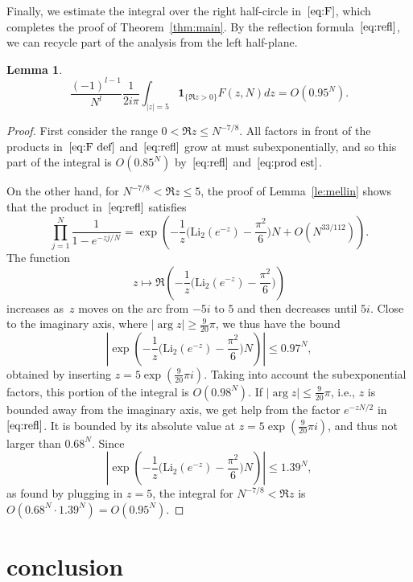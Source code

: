 \documentclass[a4paper]{amsart}
\newtheorem{lemma}[theorem]{Lemma}
\begin{document}
Finally, we estimate the integral over the right half-circle in~$\ref{eq:F}$,
which completes the proof of Theorem~\ref{thm:main}.
By the reflection formula~$\ref{eq:refl}$, we can recycle part of the
analysis from the left half-plane.

\begin{lemma}
  \[
   \frac{(-1)^{l-1}}{N^l} \frac{1}{2i\pi} \int_{|z|=5}
     \mathbf{1}_{\{\Re z>0\}} F(z,N) dz = O(0.95^N).
  \]
\end{lemma}
\begin{proof}
  First consider the range $0< \Re z \leq N^{-7/8}$. All factors
  in front of the products in~$\ref{eq:F def}$ and~$\ref{eq:refl}$
  grow at must subexponentially, and so this part of the integral
  is $O(0.85^N)$ by~$\ref{eq:refl}$ and~$\ref{eq:prod est}$.
  
  On the other hand, for $N^{-7/8}< \Re z \leq 5$, the proof
  of Lemma~\ref{le:mellin} shows that the product in~$\ref{eq:refl}$
  satisfies
  \[
    \prod_{j=1}^N \frac{1}{1-e^{-zj/N}} = \exp\left(
    -\frac{1}{z}\Big( \mathrm{Li}_2(e^{-z}) - \frac{\pi^2}{6}\Big)N
    +O(N^{33/112}) \right).
  \]
  The function
  \[
    z \mapsto \Re\left(-\frac{1}{z}
      \Big( \mathrm{Li}_2(e^{-z}) - \frac{\pi^2}{6}\Big) \right)
  \]
  increases as~$z$ moves on the arc from $-5i$ to $5$ and then
  decreases until $5i$. Close to the imaginary axis, where
  $|\arg z|\geq \tfrac{9}{20}\pi$, we thus
  have the bound
  \[
    \left|\exp\left(
    -\frac{1}{z}\Big( \mathrm{Li}_2(e^{-z}) - \frac{\pi^2}{6}\Big)N \right) \right|
    \leq 0.97^N,
  \]
  obtained by inserting $z=5\exp(\tfrac{9}{20}\pi i)$. Taking into account
  the subexponential factors, this portion of the integral
  is $O(0.98^N)$. If $|\arg z|\leq \tfrac{9}{20}\pi$, i.e., $z$ is bounded away
  from the imaginary axis, we get help from the factor $e^{-zN/2}$
  in~$\ref{eq:refl}$. It is bounded by its absolute value
  at $z=5\exp(\tfrac{9}{20}\pi i)$, and thus not larger than $0.68^N$.
  Since
  \[
    \left|\exp\left(
    -\frac{1}{z}\Big( \mathrm{Li}_2(e^{-z}) - \frac{\pi^2}{6}\Big)N \right) \right|
    \leq 1.39^N,
  \]
  as found by plugging in $z=5$, the integral for $N^{-7/8}< \Re z$
  is $O(0.68^N \cdot 1.39^N)=O(0.95^N)$.
\end{proof}

\section{conclusion}
\end{document}
